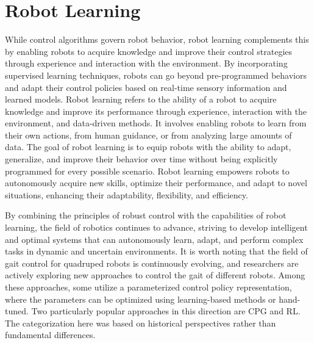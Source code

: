 \section{Robot Learning}
While control algorithms govern robot behavior, robot learning complements this by enabling robots to acquire knowledge and improve their control strategies through experience and interaction with the environment. By incorporating supervised learning techniques, robots can go beyond pre-programmed behaviors and adapt their control policies based on real-time sensory information and learned models\cite{whiteheadLearningPerceiveAct1991}. Robot learning refers to the ability of a robot to acquire knowledge and improve its performance through experience, interaction with the environment, and data-driven methods. It involves enabling robots to learn from their own actions, from human guidance, or from analyzing large amounts of data. The goal of robot learning is to equip robots with the ability to adapt, generalize, and improve their behavior over time without being explicitly programmed for every possible scenario. Robot learning empowers robots to autonomously acquire new skills, optimize their performance, and adapt to novel situations, enhancing their adaptability, flexibility, and efficiency. 

By combining the principles of robust control with the capabilities of robot learning, the field of robotics continues to advance, striving to develop intelligent and optimal systems that can autonomously learn, adapt, and perform complex tasks in dynamic and uncertain environments. It is worth noting that the field of gait control for quadruped robots is continuously evolving, and researchers are actively exploring new approaches to control the gait of different robots. Among these approaches\cite{nakamuraReinforcementLearningBiped2007, wangHierarchicalGaitGeneration2021, leeQuadrupedRobotObstacle2006, choiLearningQuadrupedalLocomotion2023}, some utilize a parameterized control policy representation, where the parameters can be optimized using learning-based methods or hand-tuned. Two particularly popular approaches in this direction are \ac{CPG} and \ac{RL}. The categorization here was based on historical perspectives rather than fundamental differences.

